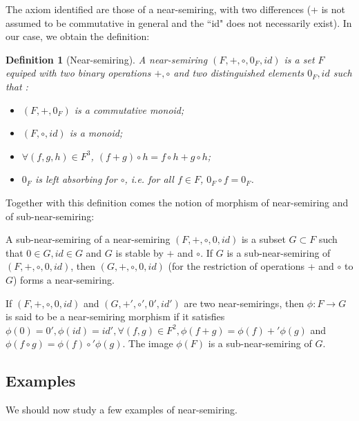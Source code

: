 \documentclass[11pt,a4paper]{article}
\newtheorem{definition}{Definition}
\begin{document}
The axiom identified are those of a near-semiring, with two differences (+ is not assumed to be commutative in general and the ``id" does not necessarily exist). In our case, we obtain the definition:

\begin{definition}[Near-semiring]

	A \textit{near-semiring} $(F,+,\circ,0_F,id)$ is a set $F$ equiped with two binary operations $+,\circ$ and two distinguished elements $0_F,id$ such that :
	
	\begin{itemize}

		\item $(F,+,0_F)$ is a commutative monoid;

		\item $(F,\circ,id)$ is a monoid;

		\item $\forall (f,g,h) \in F^3$, $(f+g) \circ h = f \circ h + g \circ h$;

		\item $0_F$ is left absorbing for $\circ$, i.e. for all $f \in F$, $0_F \circ f = 0_F$.

	\end{itemize}

\end{definition}

Together with this definition comes the notion of morphism of near-semiring and of sub-near-semiring:

A sub-near-semiring of a near-semiring $(F,+,\circ,0,id)$ is a subset $G \subset F$ such that $0 \in G, id \in G$ and $G$ is stable by $+$ and $\circ$. If $G$ is a sub-near-semiring of $(F,+,\circ,0,id)$, then $(G,+,\circ,0,id)$ (for the restriction of operations + and $\circ$ to $G$) forms a near-semiring.

If $(F,+,\circ,0,id)$ and $(G,+',\circ ',0',id')$ are two near-semirings, then $\phi : F \to G$ is said to be a near-semiring morphism if it satisfies $\phi(0)=0',\phi(id)=id',\forall (f,g) \in F^2, \phi(f+g) = \phi(f) +' \phi(g)$ and $ \phi(f \circ g)= \phi(f) \circ' \phi(g)$. The image $\phi(F)$ is a sub-near-semiring of $G$.

\subsection{Examples}

We should now study a few examples of near-semiring.
\end{document}

